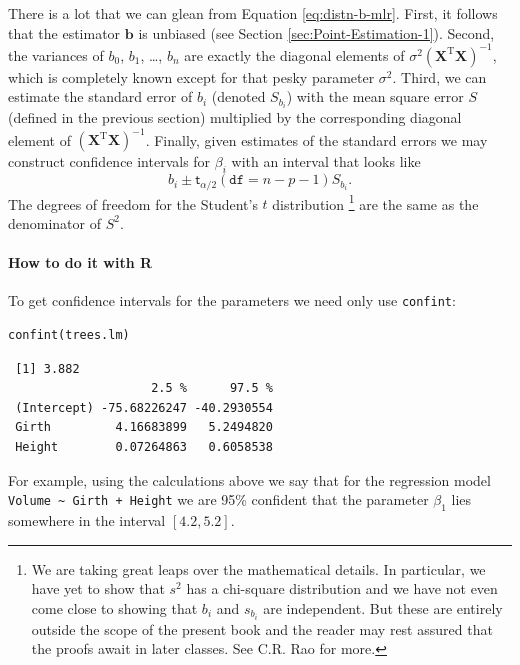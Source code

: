 \documentclass[captions=tableheading]{scrbook}
\begin{document}
There is a lot that we can glean from Equation \ref{eq:distn-b-mlr}. First, it follows that the estimator \(\mathbf{b}\) is unbiased (see Section \ref{sec:Point-Estimation-1}). Second, the variances of \(b_{0}\), \(b_{1}\), \ldots{}, \(b_{n}\) are exactly the diagonal elements of \(\sigma^{2}\left(\mathbf{X}^{\mathrm{T}}\mathbf{X}\right)^{-1}\), which is completely known except for that pesky parameter \(\sigma^{2}\). Third, we can estimate the standard error of \(b_{i}\) (denoted \(S_{b_{i}}\)) with the mean square error \(S\) (defined in the previous section) multiplied by the corresponding diagonal element of \(\left(\mathbf{X}^{\mathrm{T}}\mathbf{X}\right)^{-1}\). Finally, given estimates of the standard errors we may construct confidence intervals for \(\beta_{i}\) with an interval that looks like
\begin{equation}
b_{i}\pm\mathsf{t}_{\alpha/2}(\mathtt{df}=n-p-1)S_{b_{i}}.
\end{equation}
The degrees of freedom for the Student's \(t\) distribution
\footnote{We are taking great leaps over the mathematical details. In particular, we have yet to show that \(s^{2}\) has a chi-square distribution and we have not even come close to showing that \(b_{i}\) and \(s_{b_{i}}\) are independent. But these are entirely outside the scope of the present book and the reader may rest assured that the proofs await in later classes. See C.R. Rao for more.}
are the same as the denominator of \(S^{2}\). 

\paragraph*{How to do it with \textsf{R}}

To get confidence intervals for the parameters we need only use \texttt{confint}:


\begin{verbatim}
confint(trees.lm)
\end{verbatim}

\begin{verbatim}
 [1] 3.882
                    2.5 %      97.5 %
 (Intercept) -75.68226247 -40.2930554
 Girth         4.16683899   5.2494820
 Height        0.07264863   0.6058538
\end{verbatim}



For example, using the calculations above we say that for the regression model \texttt{Volume \textasciitilde{} Girth + Height} we are 95\% confident that the parameter \(\beta_{1}\) lies somewhere in the interval \( [  4.2,  5.2 ] \).
\end{document}
